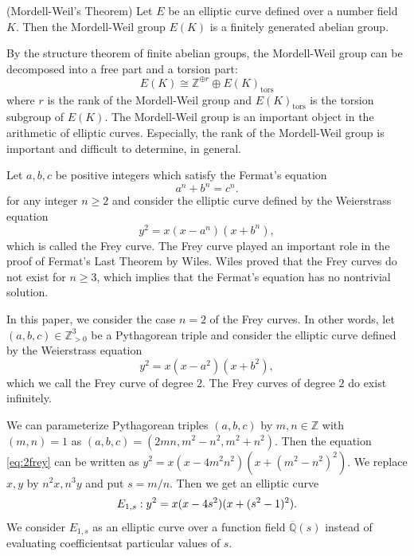 \documentclass[main]{subfiles}
\begin{document}
\begin{thm}{(Mordell-Weil's Theorem)}
    \label{thm:mordell}
    Let $E$ be an elliptic curve defined over a number field $K$.
    Then the Mordell-Weil group $E(K)$ is a finitely generated abelian group.
\end{thm}
By the structure theorem of finite abelian groups, the Mordell-Weil group can be decomposed into a free part and a torsion part:
\begin{equation*}
    E(K) \cong \mathbb{Z}^{\oplus r} \oplus E(K)_{\text{tors}}
\end{equation*}
where $r$ is the rank of the Mordell-Weil group and $E(K)_{\text{tors}}$ is the torsion subgroup of $E(K)$.
The Mordell-Weil group is an important object in the arithmetic of elliptic curves.
Especially, the rank of the Mordell-Weil group is important and difficult to determine, in general.

Let $a,b,c$ be positive integers which satisfy the Fermat's equation
\begin{equation*}
    a^{n} + b^{n} = c^{n}.
\end{equation*}
for any integer $n \geq 2$ and consider the elliptic curve defined by the Weierstrass equation
\begin{equation*}
    y^{2} = x(x - a^{n})(x + b^{n}),
\end{equation*}
which is called the Frey curve.
The Frey curve played an important role in the proof of Fermat's Last Theorem by Wiles.
Wiles proved that the Frey curves do not exist for $n \geq 3$, which implies that the Fermat's equation has no nontrivial solution.

In this paper, we consider the case $n=2$ of the Frey curves.
In other words, let $(a,b,c) \in \mathbb{Z}_{> 0}^3$ be a Pythagorean triple and consider the elliptic curve defined by the Weierstrass equation
\begin{equation}
    \label{eq:2frey}
    y^{2} = x(x - a^{2})(x + b^{2}),
\end{equation}
which we call the Frey curve of degree $2$.
The Frey curves of degree $2$ do exist infinitely.

We can parameterize Pythagorean triples $(a,b,c)$ by $m,n \in \mathbb{Z}$ with $(m,n)=1$ as $(a,b,c) = (2mn, m^{2} - n^{2}, m^{2} + n^{2})$.
Then the equation \eqref{eq:2frey} can be written as $y^{2} = x(x - 4m^2n^2)(x + (m^{2} - n^2)^{2})$.
We replace $x,y$ by $n^2x, n^3y$ and put $s = m/n$.
Then we get an elliptic curve
\begin{equation}
    \label{eq:E_{1,s}}
    E_{1,s}: y^{2} = x(x - 4s^{2})(x + (s^{2} - 1)^{2}).
\end{equation}
We consider $E_{1,s}$ as an elliptic curve over a function field $\overline{\mathbb{Q}}(s)$ instead of evaluating coefficientsat particular values of $s$.
\end{document}
